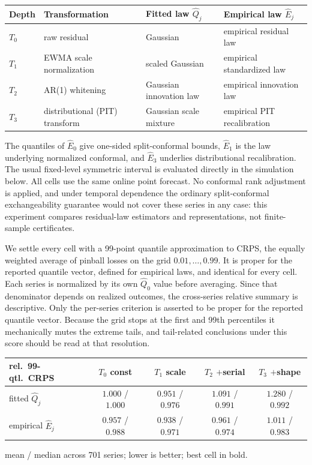 \documentclass[11pt]{article}
\theoremstyle{remark}
\begin{document}
\begin{center}
\small
\begin{tabular}{llll}
\toprule
Depth & Transformation & Fitted law $\widehat Q_j$ & Empirical law $\widehat E_j$\\
\midrule
$T_0$ & raw residual & Gaussian & empirical residual law\\
$T_1$ & EWMA scale normalization & scaled Gaussian & empirical standardized law\\
$T_2$ & AR(1) whitening & Gaussian innovation law & empirical innovation law\\
$T_3$ & distributional (PIT) transform & Gaussian scale mixture & empirical PIT recalibration\\
\bottomrule
\end{tabular}
\end{center}

The quantiles of $\widehat E_0$ give one-sided split-conformal bounds, $\widehat E_1$ is the
law underlying normalized conformal, and $\widehat E_3$ underlies distributional
recalibration. The usual fixed-level symmetric interval is evaluated directly in the
simulation below. All cells use the same online point forecast. No conformal rank adjustment
is applied, and under temporal dependence the ordinary split-conformal exchangeability
guarantee would not cover these series in any case: this experiment compares residual-law
estimators and representations, not finite-sample certificates.

We settle every cell with a 99-point quantile approximation to CRPS, the equally weighted
average of pinball losses on the grid $0.01,\dots,0.99$. It is proper for the reported
quantile vector, defined for empirical laws, and identical for every cell. Each series is normalized by its own $\widehat Q_0$ value before averaging. Since that
denominator depends on realized outcomes, the cross-series relative summary is descriptive.
Only the per-series criterion is asserted to be proper for the reported quantile vector. Because the grid stops at the first
and 99th percentiles it mechanically mutes the extreme tails, and tail-related conclusions
under this score should be read at that resolution.

\begin{center}
\begin{tabular}{lcccc}
\toprule
rel.\ 99-qtl.\ CRPS & $T_0$ const & $T_1$ scale & $T_2$ $+$serial & $T_3$ $+$shape\\
\midrule
fitted $\widehat Q_j$ & $1.000$ / $1.000$ & $0.951$ / $0.976$ & $1.091$ / $0.991$ & $1.280$ / $0.992$\\
empirical $\widehat E_j$ & $0.957$ / $0.988$ & $\mathbf{0.938}$ / $\mathbf{0.971}$ & $0.961$ / $0.974$ & $1.011$ / $0.983$\\
\bottomrule
\end{tabular}
\par\smallskip
{\small mean / median across 701 series; lower is better; best cell in bold.}
\end{center}
\end{document}
